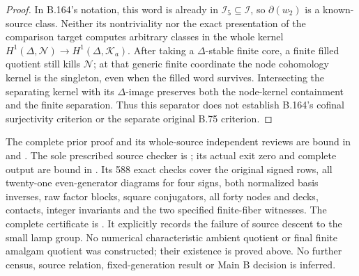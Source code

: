 \begin{proof}
In B.164's notation, this word is already in \(\mathcal I_5\subseteq
\mathcal I\), so \(\partial(w_2)\) is a known-source class. Neither
its nontriviality nor the exact presentation of the comparison target
computes arbitrary classes in the whole kernel
\(H^1(\Delta,\mathcal N)\to H^1(\Delta,\mathcal K_a)\).
After taking a \(\Delta\)-stable finite core, a finite filled quotient
still kills \(\mathcal N\); at that generic finite coordinate the node
cohomology kernel is the singleton, even when the filled word survives.
Intersecting the separating kernel with its \(\Delta\)-image preserves
both the node-kernel containment and the finite separation. Thus this separator does not establish B.164's
cofinal surjectivity criterion or the separate original B.75 criterion.
\end{proof}

\begingroup\footnotesize\raggedright
The complete prior proof and its whole-source independent reviews are
bound in  and
.
The sole prescribed source checker is
; its actual exit zero
and complete output are bound in
.
Its 588 exact checks cover the original signed rows, all twenty-one
even-generator diagrams for four signs, both normalized basis inverses,
raw factor blocks, square conjugators, all forty nodes and decks, contacts,
integer invariants and the two specified finite-fiber witnesses.
The complete certificate is
.
It explicitly records the failure of source descent to the small lamp
group. No numerical characteristic ambient quotient or final finite
amalgam quotient was constructed; their existence is proved above.
No further census, source relation, fixed-generation result or Main B
decision is inferred.
\par\endgroup
